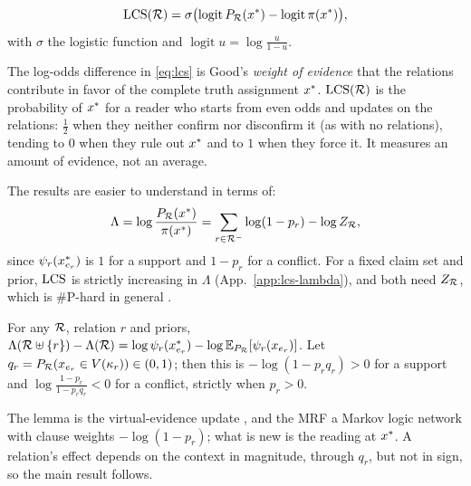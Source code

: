 
\begin{definition}
\label{def:score}
\begin{equation}
\mathrm{LCS}(\mathcal{R})=\sigma\bigl(\operatorname{logit}P_{\mathcal{R}}(x^{\ast})-\operatorname{logit}\pi(x^{\ast})\bigr),
\label{eq:lcs}
\end{equation}
with $\sigma$ the logistic function and $\operatorname{logit}u=\log\frac{u}{1-u}$.
\end{definition}

The log-odds difference in \eqref{eq:lcs} is Good's \emph{weight of evidence} \citep{good1950} that 
the relations contribute in favor of the complete truth assignment $x^{\ast}$. $\mathrm{LCS}(\mathcal{R})$ is the probability of $x^{\ast}$ for a reader who starts from even odds and updates on the
relations: $\frac12$ when they neither confirm nor disconfirm it (as with no relations), tending to $0$
when they rule out $x^{\ast}$ and to $1$ when they force it. It measures an amount of evidence, not an
average.


The results are easier to understand in terms of:
\begin{equation}
\Lambda=\log\frac{P_{\mathcal{R}}(x^{\ast})}{\pi(x^{\ast})}=\sum_{r\in\mathcal{R}^{-}}\log(1-p_r)-\log Z_{\mathcal{R}},
\label{eq:lambda}
\end{equation}
since $\psi_r(x^{\ast}_{e_r})$ is $1$ for a support and $1-p_r$ for a conflict. For a fixed claim set and
prior, $\mathrm{LCS}$ is strictly increasing in $\Lambda$ (App.~\ref{app:lcs-lambda}), and both need $Z_{\mathcal{R}}$, which
is \#P-hard in general \cite{koller2009probabilistic}.



\begin{lemma}
\label{lem:edit}
For any $\mathcal{R}$, relation $r$ and priors,
$\Lambda(\mathcal{R}\uplus\{r\})-\Lambda(\mathcal{R})=\log\psi_r(x^{\ast}_{e_r})-\log\mathbb{E}_{P_{\mathcal{R}}}[\psi_r(x_{e_r})]$. Let
$q_r=P_{\mathcal{R}}(x_{e_r}\in V(\kappa_r))\in(0,1)$; then this is $-\log(1-p_rq_r)>0$ for a support and
$\log\frac{1-p_r}{1-p_rq_r}<0$ for a conflict, strictly when $p_r>0$.
\end{lemma}

The lemma is the virtual-evidence update \citep{pearl1988,chan2005}, and the MRF a Markov logic
network \citep{mln} with clause weights $-\log(1-p_r)$; what is new is the reading at $x^{\ast}$. A relation's effect depends on the context in magnitude, through $q_r$, but not in sign, so the main
result follows.


